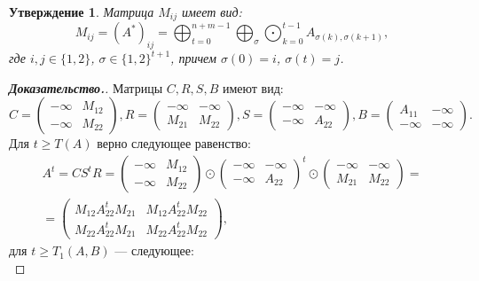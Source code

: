 \documentclass[12pt]{article}
\newtheorem{proposition}[theorem]{Утверждение}
\begin{document}
\begin{proposition}
Матрица $M_{ij}$ имеет вид:
\begin{equation*}
M_{ij} = (A^*)_{ij} = \bigoplus_{t = 0}^{n + m - 1}\bigoplus_{\sigma}\bigodot_{k = 0}^{t - 1} A_{\sigma(k), \sigma(k + 1)},
\end{equation*}
где $i, j \in \{1, 2\}$, $\sigma \in \{1, 2\}^{t + 1}$, причем $\sigma(0) = i$, $\sigma(t) = j$.
\end{proposition}
\begin{proof}[\textbf{Доказательство.}]
Матрицы $C, R, S, B$ имеют вид:
\begin{equation*}
C = \begin{pmatrix}
-\infty & M_{12}\\
-\infty & M_{22}
\end{pmatrix}, 
R = \begin{pmatrix}
-\infty & -\infty \\
M_{21} & M_{22}
\end{pmatrix}, 
S = \begin{pmatrix}
-\infty & -\infty \\
-\infty & A_{22}
\end{pmatrix},
B = \begin{pmatrix}
A_{11} & -\infty \\
-\infty & -\infty
\end{pmatrix}.
\end{equation*}
Для $t \ge T(A)$ верно следующее равенство:
\begin{multline*}
A^t = CS^tR = \begin{pmatrix}
-\infty & M_{12}\\
-\infty & M_{22}
\end{pmatrix} \odot \begin{pmatrix}
-\infty & -\infty \\
-\infty & A_{22}
\end{pmatrix}^t \odot \begin{pmatrix}
-\infty & -\infty \\
M_{21} & M_{22}
\end{pmatrix} = \\
= \begin{pmatrix}
	M_{12}A_{22}^tM_{21} & M_{12}A_{22}^tM_{22} \\
	M_{22}A_{22}^tM_{21} & M_{22}A_{22}^tM_{22}
\end{pmatrix},
\end{multline*}
для $t \ge T_1(A, B)$ --- следующее:
\begin{equation*}

\end{equation*}
\end{proof}
\end{document}
